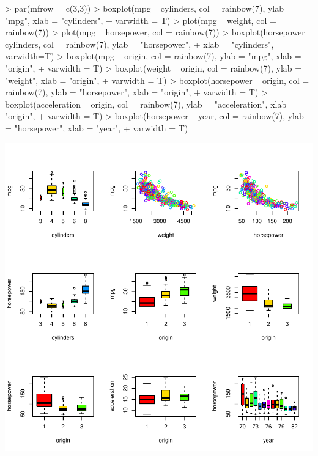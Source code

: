 \documentclass[a4paper]{article}
\begin{document}
\begin{enumerate}
\begin{Schunk}
\begin{Sinput}
> par(mfrow = c(3,3))
> boxplot(mpg ~ cylinders, col = rainbow(7), ylab = "mpg", xlab = "cylinders",
+         varwidth = T)
> plot(mpg ~ weight, col = rainbow(7))
> plot(mpg ~ horsepower, col = rainbow(7))
> boxplot(horsepower ~ cylinders, col = rainbow(7), ylab = "horsepower",
+         xlab = "cylinders", varwidth=T)
> boxplot(mpg ~ origin, col = rainbow(7), ylab = "mpg", xlab = "origin",
+         varwidth = T)
> boxplot(weight ~ origin, col = rainbow(7), ylab = "weight", xlab = "origin",
+         varwidth = T)
> boxplot(horsepower ~ origin, col = rainbow(7), ylab = "horsepower", xlab = "origin",
+         varwidth = T)
> boxplot(acceleration ~ origin, col = rainbow(7), ylab = "acceleration", xlab = "origin",
+         varwidth = T)
> boxplot(horsepower ~ year, col = rainbow(7), ylab = "horsepower", xlab = "year",
+         varwidth = T)
\end{Sinput}
\end{Schunk}
\includegraphics{introduction-mpg-cylinder}



\end{enumerate}
\end{document}
